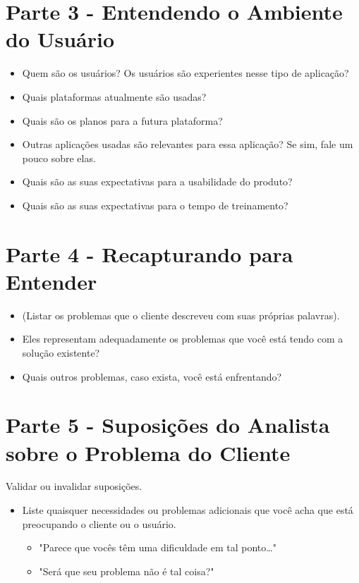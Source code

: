 \begin{anexosenv}
\section{Parte 3 - Entendendo o Ambiente do Usuário}
\begin{itemize}
  \item Quem são os usuários? Os usuários são experientes nesse tipo de aplicação?
  \item Quais plataformas atualmente são usadas?
  \item Quais são os planos para a futura plataforma?
  \item Outras aplicações usadas são relevantes para essa aplicação? Se sim, fale um pouco sobre elas.
  \item Quais são as suas expectativas para a usabilidade do produto?
  \item Quais são as suas expectativas para o tempo de treinamento?
\end{itemize}

\section{Parte 4 - Recapturando para Entender}
\begin{itemize}
  \item (Listar os problemas que o cliente descreveu com suas próprias palavras).
  \item Eles representam adequadamente os problemas que você está tendo com a solução existente?
  \item Quais outros problemas, caso exista, você está enfrentando?
\end{itemize}

\section{Parte 5 - Suposições do Analista sobre o Problema do Cliente}
Validar ou invalidar suposições.

\begin{itemize}
  \item Liste quaisquer necessidades ou problemas adicionais que você acha que está preocupando o cliente ou o usuário.
    \begin{itemize}
      \item "Parece que vocês têm uma dificuldade em tal ponto…"
      \item "Será que seu problema não é tal coisa?"
    \end{itemize}


\end{itemize}
\end{anexosenv}
